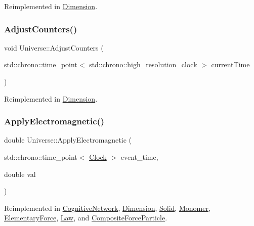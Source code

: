Reimplemented in \mbox{\hyperlink{classDimension_a278d8c3df7896eb01c55283482f8674a}{Dimension}}.

\mbox{\label{classUniverse_a15aa20218286fd11ecb9b792dfb63be3}} 
\subsubsection{\texorpdfstring{Adjust\+Counters()}{AdjustCounters()}}
{\footnotesize\ttfamily void Universe\+::\+Adjust\+Counters (\begin{DoxyParamCaption}\item[{std\+::chrono\+::time\+\_\+point$<$ std\+::chrono\+::high\+\_\+resolution\+\_\+clock $>$}]{current\+Time }\end{DoxyParamCaption})\hspace{0.3cm}{\ttfamily [virtual]}}



Reimplemented in \mbox{\hyperlink{classDimension_a31e28c2777888449fad32843f6dd15ed}{Dimension}}.

\mbox{\label{classUniverse_a1f787da78fa196ba635db21a9e91dabb}} 
\subsubsection{\texorpdfstring{Apply\+Electromagnetic()}{ApplyElectromagnetic()}}
{\footnotesize\ttfamily double Universe\+::\+Apply\+Electromagnetic (\begin{DoxyParamCaption}\item[{std\+::chrono\+::time\+\_\+point$<$ \mbox{\hyperlink{universe_8h_a0ef8d951d1ca5ab3cfaf7ab4c7a6fd80}{Clock}} $>$}]{event\+\_\+time,  }\item[{double}]{val }\end{DoxyParamCaption})\hspace{0.3cm}{\ttfamily [virtual]}}



Reimplemented in \mbox{\hyperlink{classCognitiveNetwork_ae590ecb77db0a876425b9b74bcfe2bce}{Cognitive\+Network}}, \mbox{\hyperlink{classDimension_a65bcd3c09792cf53b1f614eff49cf111}{Dimension}}, \mbox{\hyperlink{classSolid_ab546d607d6f0bf70dc5e6bbac8baf287}{Solid}}, \mbox{\hyperlink{classMonomer_ae64dfbf82610ae26427be9c824aef70f}{Monomer}}, \mbox{\hyperlink{classElementaryForce_a0045a3380e468c6cfdbefce829888c1f}{Elementary\+Force}}, \mbox{\hyperlink{classLaw_a418791aee2a9204a99d3a917b86fafd3}{Law}}, and \mbox{\hyperlink{classCompositeForceParticle_afa4dc18258722b3c85fbc9789a4297a5}{Composite\+Force\+Particle}}.

